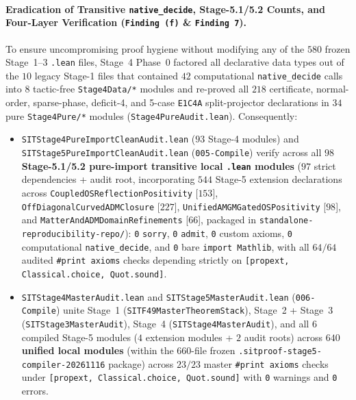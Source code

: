 \paragraph{Eradication of Transitive \texttt{native\_decide}, Stage-5.1/5.2 Counts, and Four-Layer Verification (\texttt{Finding (f)} \& \texttt{Finding 7}).}
To ensure uncompromising proof hygiene without modifying any of the $580$ frozen Stage~1--3 \texttt{.lean} files, Stage~4 Phase~0 factored all declarative data types out of the $10$ legacy Stage-1 files that contained $42$ computational \texttt{native\_decide} calls into $8$ tactic-free \texttt{Stage4Data/*} modules and re-proved all $218$ certificate, normal-order, sparse-phase, deficit-4, and 5-case \texttt{E1C4A} split-projector declarations in $34$ pure \texttt{Stage4Pure/*} modules (\texttt{Stage4PureAudit.lean}). Consequently:
\begin{itemize}
  \item \texttt{SITStage4\allowbreak{}Pure\allowbreak{}Import\allowbreak{}Clean\allowbreak{}Audit.\allowbreak{}lean} ($93$ Stage-4 modules) and \texttt{SITStage5\allowbreak{}Pure\allowbreak{}Import\allowbreak{}Clean\allowbreak{}Audit.\allowbreak{}lean} (\texttt{005-Compile}) verify across all \textbf{$98$ Stage-5.1/5.2 pure-import transitive local \texttt{.lean} modules} ($97$ strict dependencies + audit root, incorporating $544$ Stage-5 extension declarations across \texttt{Coupled\allowbreak{}OSReflection\allowbreak{}Positivity} [$153$], \texttt{Off\allowbreak{}Diagonal\allowbreak{}Curved\allowbreak{}ADMClosure} [$227$], \texttt{Unified\allowbreak{}AMGMGated\allowbreak{}OSPositivity} [$98$], and \texttt{Matter\allowbreak{}And\allowbreak{}ADMDomain\allowbreak{}Refinements} [$66$], packaged in \texttt{standalone-reproducibility-repo/}): \texttt{0} \texttt{sorry}, \texttt{0} \texttt{admit}, \texttt{0} custom axioms, \texttt{0} computational \texttt{native\_decide}, and \texttt{0} bare \texttt{import Mathlib}, with all $64/64$ audited \texttt{\#print axioms} checks depending strictly on \texttt{[propext, Classical.\allowbreak{}choice, Quot.\allowbreak{}sound]}.
  \item \texttt{SITStage4\allowbreak{}Master\allowbreak{}Audit.\allowbreak{}lean} and \texttt{SITStage5\allowbreak{}Master\allowbreak{}Audit.\allowbreak{}lean} (\texttt{006-Compile}) unite Stage~1 (\texttt{SITF49\allowbreak{}Master\allowbreak{}Theorem\allowbreak{}Stack}), Stage~2 + Stage~3 (\texttt{SITStage3MasterAudit}), Stage~4 (\texttt{SITStage4MasterAudit}), and all $6$ compiled Stage-5 modules ($4$ extension modules + $2$ audit roots) across \textbf{$640$ unified local modules} (within the $660$-file frozen \texttt{.\allowbreak{}sitproof-stage5-compiler-20261116} package) across $23/23$ master \texttt{\#print axioms} checks under \texttt{[propext, Classical.\allowbreak{}choice, Quot.\allowbreak{}sound]} with \texttt{0} warnings and \texttt{0} errors.

\end{itemize}

